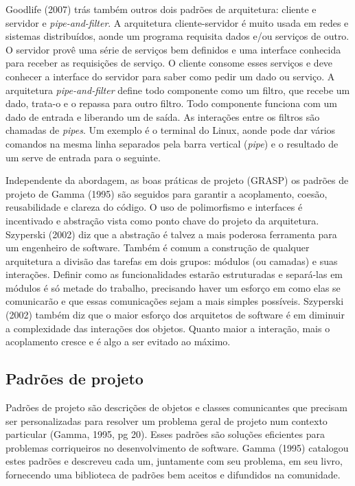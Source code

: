 Goodlife (2007) trás também outros dois padrões de arquitetura: cliente e servidor e \textit{pipe-and-filter}. A arquitetura cliente-servidor é muito usada em redes e sistemas distribuídos, aonde um programa requisita dados e/ou serviços de outro. O servidor provê uma série de serviços bem definidos e uma interface conhecida para receber as requisições de serviço. O cliente consome esses serviços e deve conhecer a interface do servidor para saber como pedir um dado ou serviço. A arquitetura \textit{pipe-and-filter} define todo componente como um filtro, que recebe um dado, trata-o e o repassa para outro filtro. Todo componente funciona com um dado de entrada e liberando um de saída. As interações entre os filtros são chamadas de \textit{pipes}. Um exemplo é o terminal do Linux, aonde pode dar vários comandos na mesma linha separados pela barra vertical (\textit{pipe}) e o resultado de um serve de entrada para o seguinte.

Independente da abordagem, as boas práticas de projeto (GRASP) os padrões de projeto de Gamma (1995) são seguidos para garantir a acoplamento, coesão, reusabilidade e clareza do código. O uso de polimorfismo e interfaces é incentivado e abstração vista como ponto chave do projeto da arquitetura. Szyperski (2002) diz que a abstração é talvez a mais poderosa ferramenta para um engenheiro de software. Também é comum a construção de qualquer arquitetura a divisão das tarefas em dois grupos: módulos (ou camadas) e suas interações. Definir como as funcionalidades estarão estruturadas e separá-las em módulos é só metade do trabalho, precisando haver um esforço em como elas se comunicarão e que essas comunicações sejam a mais simples possíveis. Szyperski (2002) também diz que o maior esforço dos arquitetos de software é em diminuir a complexidade das interações dos objetos. Quanto maior a interação, mais o acoplamento cresce e é algo a ser evitado ao máximo.

\subsection{Padrões de projeto}

Padrões de projeto são descrições de objetos e classes comunicantes que precisam ser personalizadas para resolver um problema geral de projeto num contexto particular (Gamma, 1995, pg 20). Esses padrões são soluções eficientes para problemas corriqueiros no desenvolvimento de software. Gamma (1995) catalogou estes padrões e descreveu cada um, juntamente com seu problema, em seu livro, fornecendo uma biblioteca de padrões bem aceitos e difundidos na comunidade.

